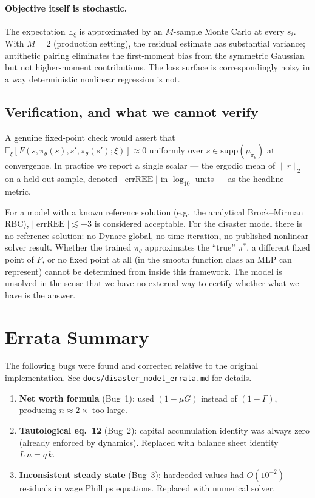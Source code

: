 \documentclass[11pt]{article}
\begin{document}
\paragraph{Objective itself is stochastic.}
The expectation $\mathbb{E}_\xi$ is approximated by an $M$-sample Monte
Carlo at every $s_i$. With $M = 2$ (production setting), the residual
estimate has substantial variance; antithetic pairing eliminates the
first-moment bias from the symmetric Gaussian but not higher-moment
contributions. The loss surface is correspondingly noisy in a way
deterministic nonlinear regression is not.

\subsection{Verification, and what we cannot verify}

A genuine fixed-point check would assert that
$\mathbb{E}_\xi[F(s, \pi_\theta(s), s', \pi_\theta(s'); \xi)] \approx 0$
uniformly over $s \in \mathrm{supp}(\mu_{\pi_\theta})$ at convergence.
In practice we report a single scalar --- the ergodic mean of
$\|r\|_2$ on a held-out sample, denoted $|\!\operatorname{errREE}\!|$
in $\log_{10}$ units --- as the headline metric.

For a model with a known reference solution (e.g.\ the analytical
Brock--Mirman RBC), $|\!\operatorname{errREE}\!| \lesssim -3$ is
considered acceptable. For the disaster model there is no reference
solution: no Dynare-global, no time-iteration, no published nonlinear
solver result. Whether the trained $\pi_\theta$ approximates the
``true'' $\pi^*$, a different fixed point of $F$, or no fixed point
at all (in the smooth function class an MLP can represent) cannot be
determined from inside this framework. The model is unsolved in the
sense that we have no external way to certify whether what we have is
the answer.


\section{Errata Summary}
\label{sec:errata}

The following bugs were found and corrected relative to the original
implementation. See \texttt{docs/disaster\_model\_errata.md} for details.

\begin{enumerate}
\item \textbf{Net worth formula} (Bug~1): used $(1-\mu G)$ instead of
  $(1-\Gamma)$, producing $n \approx 2\times$ too large.

\item \textbf{Tautological eq.~12} (Bug~2): capital accumulation identity
  was always zero (already enforced by dynamics). Replaced with balance
  sheet identity $L\,n = q\,k$.

\item \textbf{Inconsistent steady state} (Bug~3): hardcoded values had
  $O(10^{-2})$ residuals in wage Phillips equations. Replaced with
  numerical solver.
\end{enumerate}
\end{document}

